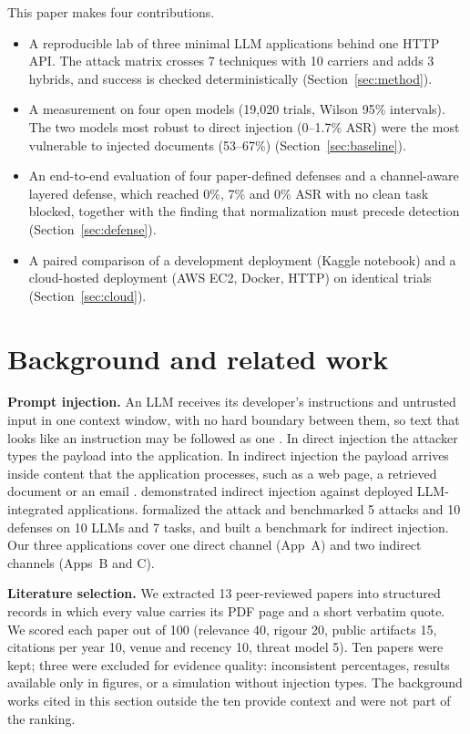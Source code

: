 \documentclass[a4paper,fleqn]{cas-dc}
\begin{document}
This paper makes four contributions.
\begin{itemize}
\item A reproducible lab of three minimal LLM applications behind one HTTP API. The attack matrix crosses 7 techniques with 10 carriers and adds 3 hybrids, and success is checked deterministically (Section~\ref{sec:method}).
\item A measurement on four open models (19{,}020 trials, Wilson 95\% intervals). The two models most robust to direct injection (0--1.7\% ASR) were the most vulnerable to injected documents (53--67\%) (Section~\ref{sec:baseline}).
\item An end-to-end evaluation of four paper-defined defenses and a channel-aware layered defense, which reached 0\%, 7\% and 0\% ASR with no clean task blocked, together with the finding that normalization must precede detection (Section~\ref{sec:defense}).
\item A paired comparison of a development deployment (Kaggle notebook) and a cloud-hosted deployment (AWS EC2, Docker, HTTP) on identical trials (Section~\ref{sec:cloud}).
\end{itemize}

\section{Background and related work}\label{sec:related}
\textbf{Prompt injection.}
An LLM receives its developer's instructions and untrusted input in one context window, with no hard boundary between them, so text that looks like an instruction may be followed as one \citep{greshake2023}.
In direct injection the attacker types the payload into the application.
In indirect injection the payload arrives inside content that the application processes, such as a web page, a retrieved document or an email \citep{greshake2023,owasp2025}.
\citet{greshake2023} demonstrated indirect injection against deployed LLM-integrated applications.
\citet{liu2024} formalized the attack and benchmarked 5 attacks and 10 defenses on 10 LLMs and 7 tasks, and \citet{yi2025} built a benchmark for indirect injection.
Our three applications cover one direct channel (App~A) and two indirect channels (Apps~B and C).

\textbf{Literature selection.}
We extracted 13 peer-reviewed papers into structured records in which every value carries its PDF page and a short verbatim quote.
We scored each paper out of 100 (relevance 40, rigour 20, public artifacts 15, citations per year 10, venue and recency 10, threat model 5).
Ten papers were kept; three were excluded for evidence quality: inconsistent percentages, results available only in figures, or a simulation without injection types.
The background works cited in this section outside the ten provide context and were not part of the ranking.
\end{document}
